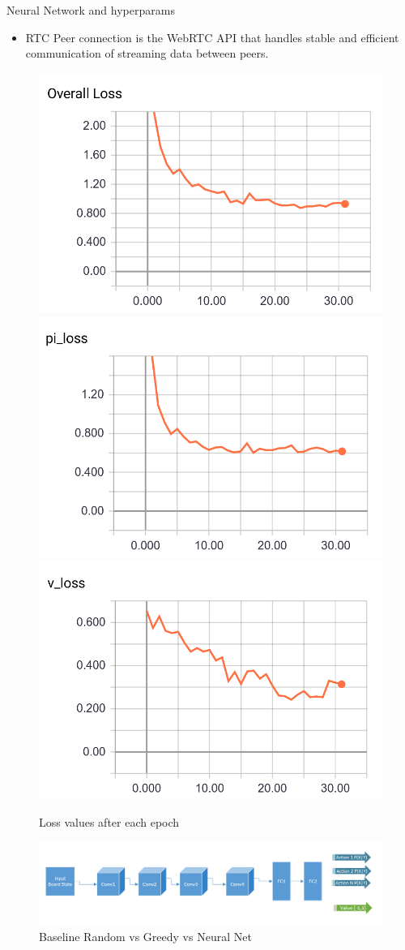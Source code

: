 \documentclass[final]{beamer}
\newlength{\onecolwid}
\newlength{\twocolwid}
\begin{document}
\begin{frame}[t]
\begin{columns}[t]
\begin{column}{\twocolwid}
\begin{columns}[t,totalwidth=\twocolwid]
\begin{column}{\onecolwid}
\begin{block}{Neural Network and hyperparams}

\begin{itemize}
\item RTC Peer connection is the WebRTC API that handles stable and efficient communication of streaming data between peers.
\end{itemize}


\begin{figure}
\includegraphics[width=0.3\linewidth]{overall_loss.png}
\includegraphics[width=0.3\linewidth]{pi_loss.png}
\includegraphics[width=0.3\linewidth]{value_loss.png}
\caption{Loss values after each epoch}
\end{figure}


\begin{figure}
\includegraphics[width=0.8\linewidth]{cnn.png}
\caption{Baseline Random vs Greedy vs Neural Net}
\end{figure}

\end{block}


\end{column} %


\end{columns}
\end{column}
\end{columns}
\end{frame}
\end{document}
